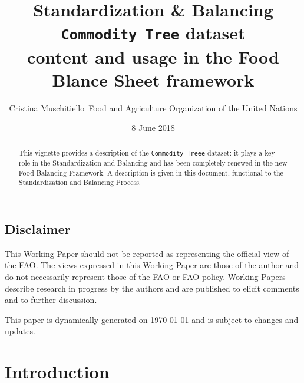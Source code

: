 \documentclass[]{article}
\title{Standardization \& Balancing\\
\texttt{Commodity\ Tree} dataset\\
content and usage in the Food Blance Sheet framework}
\author{Cristina Muschitiello~Food and Agriculture Organization of the United
Nations}
\date{8 June 2018}
\begin{document}
\maketitle
\begin{abstract}
This vignette provides a description of the \texttt{Commodity\ Treee}
dataset: it plays a key role in the Standardization and Balancing and
has been completely renewed in the new Food Balancing Framework. A
description is given in this document, functional to the Standardization
and Balancing Process.
\end{abstract}

{
\setcounter{tocdepth}{4}
\tableofcontents
}
\newpage

\listoftables

\listoffigures

\subsection*{Disclaimer}\label{disclaimer}

This Working Paper should not be reported as representing the official
view of the FAO. The views expressed in this Working Paper are those of
the author and do not necessarily represent those of the FAO or FAO
policy. Working Papers describe research in progress by the authors and
are published to elicit comments and to further discussion.

This paper is dynamically generated on \today{} and is subject to
changes and updates.

\newpage

\section{Introduction}\label{introduction}
\end{document}
